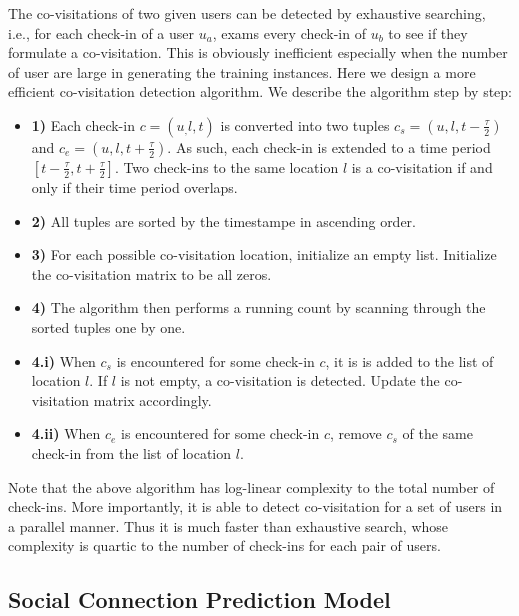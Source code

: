  The co-visitations of two given users can be detected by exhaustive searching, i.e., for each check-in of a user $u_a$, exams every check-in of $u_b$ to see if they formulate a co-visitation. This is obviously inefficient especially when the number of user are large in generating the training instances. Here we design a more efficient co-visitation detection algorithm. We describe the algorithm step by step:
\begin{itemize}[leftmargin=*]
\item \textbf{1)} Each check-in $c = (u_, l, t)$ is converted into two tuples $c_s = (u, l, t- \frac{\tau}{2})$ and $c_e = (u, l, t+\frac{\tau}{2})$. As such, each check-in is extended to a time period $[t - \frac{\tau}{2}, t + \frac{\tau}{2}]$. Two check-ins to the same location $l$ is a co-visitation if and only if their time period overlaps.
\item \textbf{2)} All tuples are sorted by the timestampe in ascending order.
\item \textbf{3)} For each possible co-visitation location, initialize an empty list. Initialize the co-visitation matrix to be all zeros.
\item \textbf{4)} The algorithm then performs a running count by scanning through the sorted tuples one by one.
\item \textbf{4.i)} When $c_s$ is encountered for some check-in $c$, it is is added to the list of location $l$. If $l$ is not empty, a co-visitation is detected. Update the co-visitation matrix accordingly.
\item \textbf{4.ii)} When $c_e$ is encountered for some check-in $c$, remove $c_s$ of the same check-in from the list of location $l$.
\end{itemize} 
Note that the above algorithm has log-linear complexity to the total number of check-ins. More importantly, it is able to detect co-visitation for a set of users in a parallel manner. Thus it is much faster than exhaustive search, whose complexity is quartic to the number of check-ins for each pair of users.

\subsection{Social Connection Prediction Model}

